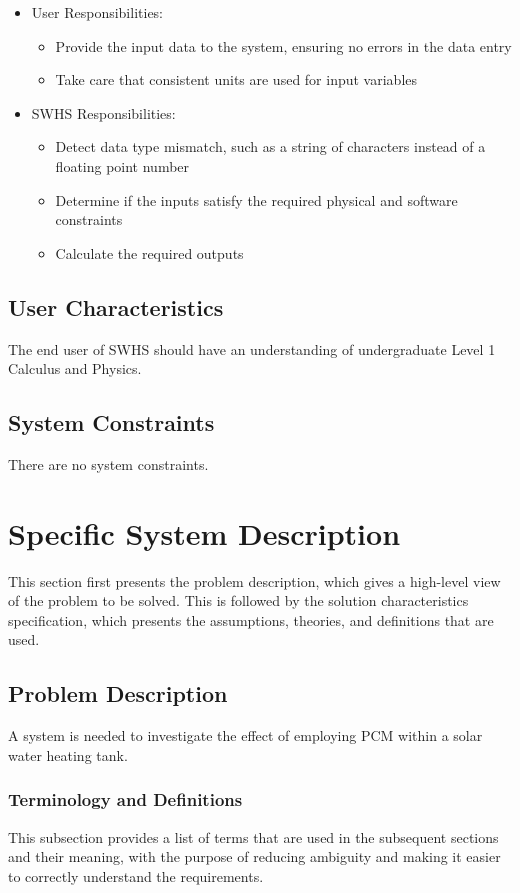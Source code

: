 \documentclass[12pt]{article}
\begin{document}
\begin{itemize}
\item{User Responsibilities:}
\begin{itemize}
\item{Provide the input data to the system, ensuring no errors in the data entry}
\item{Take care that consistent units are used for input variables}
\end{itemize}
\item{SWHS Responsibilities:}
\begin{itemize}
\item{Detect data type mismatch, such as a string of characters instead of a floating point number}
\item{Determine if the inputs satisfy the required physical and software constraints}
\item{Calculate the required outputs}
\end{itemize}
\end{itemize}
\subsection{User Characteristics}
\label{Sec:UserChars}
The end user of SWHS should have an understanding of undergraduate Level 1 Calculus and Physics.

\subsection{System Constraints}
\label{Sec:SysConstraints}
There are no system constraints.

\section{Specific System Description}
\label{Sec:SpecSystDesc}
This section first presents the problem description, which gives a high-level view of the problem to be solved. This is followed by the solution characteristics specification, which presents the assumptions, theories, and definitions that are used.

\subsection{Problem Description}
\label{Sec:ProbDesc}
A system is needed to investigate the effect of employing PCM within a solar water heating tank.

\subsubsection{Terminology and Definitions}
\label{Sec:TermDefs}
This subsection provides a list of terms that are used in the subsequent sections and their meaning, with the purpose of reducing ambiguity and making it easier to correctly understand the requirements.
\end{document}
